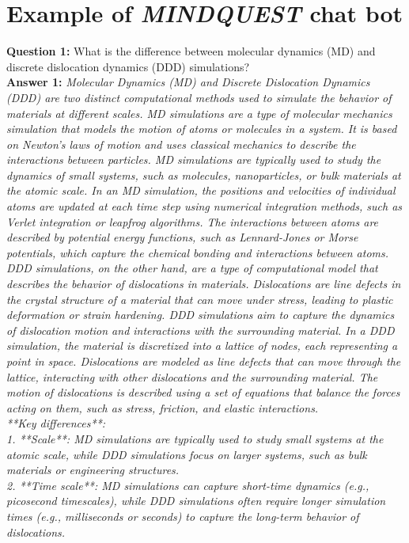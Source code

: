 \section{Example of \textit{MINDQUEST} chat bot}
\label{appendix:MINDQUEST}
\noindent
\textbf{Question 1:}
What is the difference between molecular dynamics (MD) and discrete dislocation dynamics (DDD) simulations?\\
\textbf{Answer 1:}
\textit{\small Molecular Dynamics (MD) and Discrete Dislocation Dynamics (DDD) are two distinct computational methods used to simulate the behavior of materials at different scales.
MD simulations are a type of molecular mechanics simulation that models the motion of atoms or molecules in a system. It is based on Newton's laws of motion and uses classical mechanics to describe the interactions between particles. MD simulations are typically used to study the dynamics of small systems, such as molecules, nanoparticles, or bulk materials at the atomic scale.  In an MD simulation, the positions and velocities of individual atoms are updated at each time step using numerical integration methods, such as Verlet integration or leapfrog algorithms. The interactions between atoms are described by potential energy functions, such as Lennard-Jones or Morse potentials, which capture the chemical bonding and interactions between atoms. 
DDD simulations, on the other hand, are a type of computational model that describes the behavior of dislocations in materials. Dislocations are line defects in the crystal structure of a material that can move under stress, leading to plastic deformation or strain hardening. DDD simulations aim to capture the dynamics of dislocation motion and interactions with the surrounding material. In a DDD simulation, the material is discretized into a lattice of nodes, each representing a point in space. Dislocations are modeled as line defects that can move through the lattice, interacting with other dislocations and the surrounding material. The motion of dislocations is described using a set of equations that balance the forces acting on them, such as stress, friction, and elastic interactions. \\
**Key differences**:\\
1. **Scale**: MD simulations are typically used to study small systems at the atomic scale, while DDD simulations focus on larger systems, such as bulk materials or engineering structures.\\
2. **Time scale**: MD simulations can capture short-time dynamics (e.g., picosecond timescales), while DDD simulations often require longer simulation times (e.g., milliseconds or seconds) to capture the long-term behavior of dislocations.\\
}
